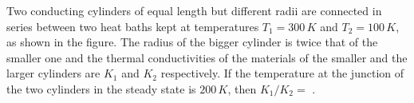 
\item Two conducting cylinders of equal length but different radii are connected in series between two heat baths kept at temperatures \(T_1 = 300 \, K\) and \(T_2 = 100 \, K\), as shown in the figure. The radius of the bigger cylinder is twice that of the smaller one and the thermal conductivities of the materials of the smaller and the larger cylinders are \(K_1\) and \(K_2\) respectively. If the temperature at the junction of the two cylinders in the steady state is \(200 \, K\), then \(K_1/K_2 = \) \underline{\hspace{2cm}}.
\begin{center}
\end{center}